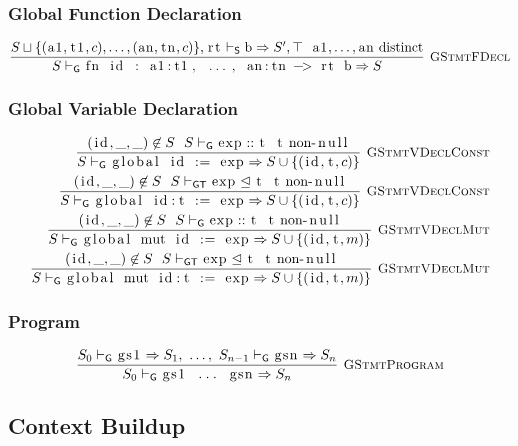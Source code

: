 \documentclass{article}
\newcommand{\code}[1]{\lstinline[columns=fixed]{#1}}
\newcommand{\drmrule}[5]{\frac{#1}{#2\vdash_{\mathsf{#3}}#4}\textsc{\ \small{#5}}}
\newcommand{\ruleapp}[1]{\vdash_{\mathsf{#1}}}
\newcommand{\mc}[1]{\textnormal{\code{#1}}}
\begin{document}
			\subsubsection{Global Function Declaration}
			
				\begin{align*}
					\drmrule{S\sqcup\{(\mc{a1},\mc{t1},c),\dots,(\mc{an},\mc{tn},c)\},\mc{rt} \ruleapp{S} \mc{b} \Rightarrow S',\top \ \ \mc{a1},\dots,\mc{an} \textnormal{ distinct}}{S}{G}{\mc{fn id : a1:t1, ..., an:tn -> rt b} \Rightarrow S}{GStmtFDecl}
				\end{align*}
			
			\subsubsection{Global Variable Declaration}
			
				\begin{align*}
					\drmrule{(\mc{id},\_,\_) \not\in S\ \ S\ruleapp{G}\mc{exp} :: \mc{t}\ \ \mc{t}\textnormal{ non-\code{null}}}{S}{G}{\mc{global id := exp} \Rightarrow S\cup\{(\mc{id},\mc{t},c)\}}{GStmtVDeclConst}\\
					\drmrule{(\mc{id},\_,\_) \not\in S\ \ S\ruleapp{GT}\mc{exp}\trianglelefteq\mc{t}\ \ \mc{t}\textnormal{ non-\code{null}}}{S}{G}{\mc{global id:t := exp} \Rightarrow S\cup\{(\mc{id},\mc{t},c)\}}{GStmtVDeclConst}\\
					\drmrule{(\mc{id},\_,\_) \not\in S\ \ S\ruleapp{G}\mc{exp} :: \mc{t}\ \ \mc{t}\textnormal{ non-\code{null}}}{S}{G}{\mc{global mut id := exp} \Rightarrow S\cup\{(\mc{id},\mc{t},m)\}}{GStmtVDeclMut}\\
					\drmrule{(\mc{id},\_,\_) \not\in S\ \ S\ruleapp{GT}\mc{exp}\trianglelefteq\mc{t}\ \ \mc{t}\textnormal{ non-\code{null}}}{S}{G}{\mc{global mut id:t := exp} \Rightarrow S\cup\{(\mc{id},\mc{t},m)\}}{GStmtVDeclMut}
				\end{align*}
			
			\subsubsection{Program}
			
				\begin{align*}
					\drmrule{S_0 \ruleapp{G} \mc{gs1} \Rightarrow S_1,\ \dots,\ S_{n-1} \ruleapp{G} \mc{gsn} \Rightarrow S_n}{S_0}{G}{\mc{gs1 ... gsn} \Rightarrow S_n}{GStmtProgram}
				\end{align*}
				
		\subsection{Context Buildup}
		
\end{document}

